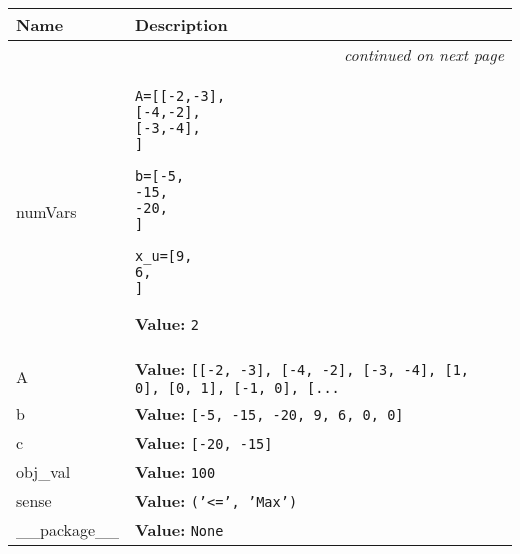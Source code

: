     \vspace{-1cm}
\hspace{\varindent}\begin{longtable}{|p{\varnamewidth}|p{\vardescrwidth}|l}
\cline{1-2}
\cline{1-2} \centering \textbf{Name} & \centering \textbf{Description}& \\
\cline{1-2}
\endhead\cline{1-2}\multicolumn{3}{r}{\small\textit{continued on next page}}\\\endfoot\cline{1-2}
\endlastfoot\raggedright n\-u\-m\-V\-a\-r\-s\- & \raggedright \begin{alltt}

A = [[-2, -3], 
     [-4, -2], 
     [-3, -4],
     ]

b = [-5, 
     -15, 
     -20,
      ]

x\_u = [9,
       6,
       ]
\end{alltt}

\textbf{Value:} 
{\tt 2}&\\
\cline{1-2}
\raggedright A\- & \raggedright \textbf{Value:} 
{\tt \texttt{[}\texttt{[}-2\texttt{, }-3\texttt{]}\texttt{, }\texttt{[}-4\texttt{, }-2\texttt{]}\texttt{, }\texttt{[}-3\texttt{, }-4\texttt{]}\texttt{, }\texttt{[}1\texttt{, }0\texttt{]}\texttt{, }\texttt{[}0\texttt{, }1\texttt{]}\texttt{, }\texttt{[}-1\texttt{, }0\texttt{]}\texttt{, }\texttt{[}\texttt{...}}&\\
\cline{1-2}
\raggedright b\- & \raggedright \textbf{Value:} 
{\tt \texttt{[}-5\texttt{, }-15\texttt{, }-20\texttt{, }9\texttt{, }6\texttt{, }0\texttt{, }0\texttt{]}}&\\
\cline{1-2}
\raggedright c\- & \raggedright \textbf{Value:} 
{\tt \texttt{[}-20\texttt{, }-15\texttt{]}}&\\
\cline{1-2}
\raggedright o\-b\-j\-\_\-v\-a\-l\- & \raggedright \textbf{Value:} 
{\tt 100}&\\
\cline{1-2}
\raggedright s\-e\-n\-s\-e\- & \raggedright \textbf{Value:} 
{\tt \texttt{(}\texttt{'}\texttt{{\textless}=}\texttt{'}\texttt{, }\texttt{'}\texttt{Max}\texttt{'}\texttt{)}}&\\
\cline{1-2}
\raggedright \_\-\_\-p\-a\-c\-k\-a\-g\-e\-\_\-\_\- & \raggedright \textbf{Value:} 
{\tt None}&\\
\cline{1-2}
\end{longtable}

